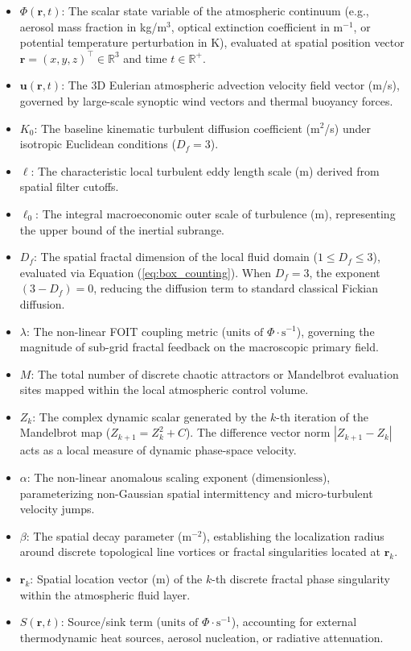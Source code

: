 \documentclass[11pt,a4paper]{article}
\begin{document}
\begin{itemize}
    \item $\Phi(\mathbf{r}, t)$: The scalar state variable of the atmospheric continuum (e.g., aerosol mass fraction in kg/m$^3$, optical extinction coefficient in m$^{-1}$, or potential temperature perturbation in K), evaluated at spatial position vector $\mathbf{r} = (x, y, z)^\top \in \mathbb{R}^3$ and time $t \in \mathbb{R}^+$.
    \item $\mathbf{u}(\mathbf{r}, t)$: The 3D Eulerian atmospheric advection velocity field vector (m/s), governed by large-scale synoptic wind vectors and thermal buoyancy forces.
    \item $K_0$: The baseline kinematic turbulent diffusion coefficient (m$^2$/s) under isotropic Euclidean conditions ($D_f = 3$).
    \item $\ell$: The characteristic local turbulent eddy length scale (m) derived from spatial filter cutoffs.
    \item $\ell_0$: The integral macroeconomic outer scale of turbulence (m), representing the upper bound of the inertial subrange.
    \item $D_f$: The spatial fractal dimension of the local fluid domain ($1 \le D_f \le 3$), evaluated via Equation (\ref{eq:box_counting}). When $D_f = 3$, the exponent $(3 - D_f) = 0$, reducing the diffusion term to standard classical Fickian diffusion.
    \item $\lambda$: The non-linear FOIT coupling metric ($\text{units of } \Phi \cdot \text{s}^{-1}$), governing the magnitude of sub-grid fractal feedback on the macroscopic primary field.
    \item $M$: The total number of discrete chaotic attractors or Mandelbrot evaluation sites mapped within the local atmospheric control volume.
    \item $Z_k$: The complex dynamic scalar generated by the $k$-th iteration of the Mandelbrot map ($Z_{k+1} = Z_k^2 + C$). The difference vector norm $|Z_{k+1} - Z_k|$ acts as a local measure of dynamic phase-space velocity.
    \item $\alpha$: The non-linear anomalous scaling exponent ($\text{dimensionless}$), parameterizing non-Gaussian spatial intermittency and micro-turbulent velocity jumps.
    \item $\beta$: The spatial decay parameter ($\text{m}^{-2}$), establishing the localization radius around discrete topological line vortices or fractal singularities located at $\mathbf{r}_k$.
    \item $\mathbf{r}_k$: Spatial location vector ($\text{m}$) of the $k$-th discrete fractal phase singularity within the atmospheric fluid layer.
    \item $S(\mathbf{r}, t)$: Source/sink term ($\text{units of } \Phi \cdot \text{s}^{-1}$), accounting for external thermodynamic heat sources, aerosol nucleation, or radiative attenuation.
\end{itemize}
\end{document}
